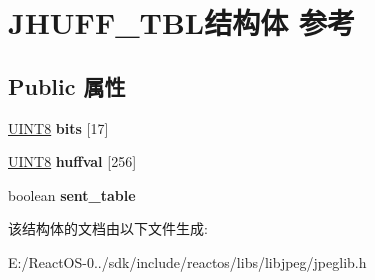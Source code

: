 \hypertarget{struct_j_h_u_f_f___t_b_l}{}\section{J\+H\+U\+F\+F\+\_\+\+T\+B\+L结构体 参考}
\label{struct_j_h_u_f_f___t_b_l}
\subsection*{Public 属性}
\begin{DoxyCompactItemize}
\item 
\mbox{\label{struct_j_h_u_f_f___t_b_l_a68b0ec25d6d06c13e0a4f74fbb683b3f}} 
\hyperlink{_processor_bind_8h_ab27e9918b538ce9d8ca692479b375b6a}{U\+I\+N\+T8} {\bfseries bits} \mbox{[}17\mbox{]}
\item 
\mbox{\label{struct_j_h_u_f_f___t_b_l_a7aad276f6ced97323bb94ba5e6220961}} 
\hyperlink{_processor_bind_8h_ab27e9918b538ce9d8ca692479b375b6a}{U\+I\+N\+T8} {\bfseries huffval} \mbox{[}256\mbox{]}
\item 
\mbox{\label{struct_j_h_u_f_f___t_b_l_a387c655e83d0d57c50802856d630f37b}} 
boolean {\bfseries sent\+\_\+table}
\end{DoxyCompactItemize}


该结构体的文档由以下文件生成\+:\begin{DoxyCompactItemize}
\item 
E\+:/\+React\+O\+S-\/0../sdk/include/reactos/libs/libjpeg/jpeglib.\+h\end{DoxyCompactItemize}
